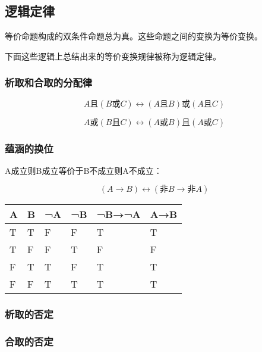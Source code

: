 \documentclass[12pt,oneside]{book}
\begin{document}
\subsection{逻辑定律}
等价命题构成的双条件命题总为真。这些命题之间的变换为等价变换。

下面这些逻辑上总结出来的等价变换规律被称为逻辑定律。

\subsubsection{析取和合取的分配律}
\begin{equation}
A \text{且} (B \text{或} C) \leftrightarrow (A \text{且} B) \text{或} (A \text{且} C)
\end{equation}

\begin{equation}
A \text{或} (B \text{且} C) \leftrightarrow (A \text{或} B) \text{且} (A \text{或} C)
\end{equation}

\subsubsection{蕴涵的换位}
A成立则B成立等价于B不成立则A不成立：

\begin{equation}
(A \rightarrow B) \leftrightarrow (\text{非}B \rightarrow \text{非}A)
\end{equation}

\begin{table}[H]
\begin{tabular}{@{}llllll@{}}
\toprule
{A} & {B} & {¬A} & {¬B} & {¬B→¬A} & {A→B} \\ \midrule

{T}          & {T} & {F}  & {F}  & {T}     & {T}   \\
{T}          & {F} & {F}  & {T}  & {F}     & {F}   \\
{F}          & {T} & {T}  & {F}  & {T}     & {T}   \\
{F}          & {F} & {T}  & {T}  & {T}     & {T}   \\ \bottomrule
\end{tabular}
\end{table}

\subsubsection{析取的否定}

\subsubsection{合取的否定}
\end{document}
